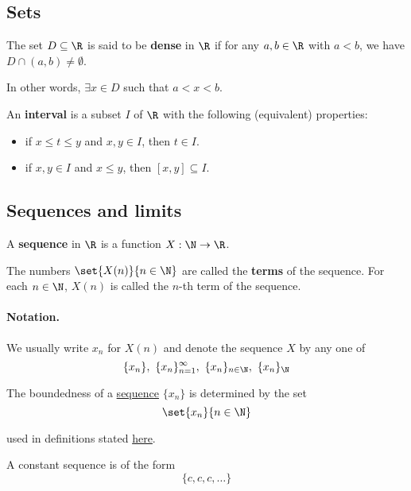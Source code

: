 \subsection{Sets}\label{f5b7518}

\label{e929c5e}

The set $D\subseteq\R$ is said to be \textbf{dense} in $\R$ if for any
$a,b\in\R$ with $a<b$, we have $D\cap(a,b)\neq\emptyset$.

In other words, $\exists x\in D$ such that $a<x<b$.

\label{c65e94a}

An \textbf{interval} is a subset $I$ of $\R$ with the following (equivalent)
properties:
\begin{itemize}
  \item if $x\leq t\leq y$ and $x,y\in I$, then $t\in I$.
  \item if $x,y\in I$ and $x\leq y$, then $[x,y]\subseteq I$.
\end{itemize}

\nextsection
\subsection{Sequences and limits}\label{d310a77}

\label{b5fa0e4}

A \textbf{sequence} in $\R$ is a function $X:\N\to\R$.

The numbers $\set{X(n)}{n\in\N}$ are called the \textbf{terms} of the sequence.
For each $n\in\N$, $X(n)$ is called the $n$-th term of the sequence.

\paragraph{Notation.}

We usually write $x_n$ for $X(n)$ and denote the sequence $X$ by any one of
$$
  \{x_n\},\ \{x_n\}_{n=1}^\infty,\ \{x_n\}_{n\in\N},\ \{x_n\}_\N
$$

\label{d5ed299}

The boundedness of a \href{b5fa0e4}{sequence} $\{x_n\}$ is determined by the
set
$$
  \set{x_n}{n\in\N}
$$

used in definitions stated \href{e4698be}{here}.

\label{d661313}

A constant sequence is of the form
$$
  \{c,c,c,\ldots\}
$$

